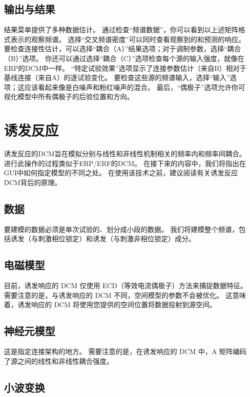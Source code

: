 \subsection{输出与结果}

结果菜单提供了多种数据估计。
通过检查“频谱数据”，你可以看到以上述矩阵格式表示的观察频谱。
选择“交叉频谱密度”可以同时查看观察到的和预测的响应。
要检查连接性估计，可以选择“耦合（A）”结果选项；对于调制参数，选择“耦合（B）”选项。
你还可以通过选择“耦合（C）”选项检查每个源的输入强度，就像在ERP的DCM中一样。
“特定试验效果”选项显示了连接参数估计（来自B）相对于基线连接（来自A）的逐试验变化。
要检查这些源的频谱输入，选择“输入”选项；这应该看起来像是白噪声和粉红噪声的混合。
最后，“偶极子”选项允许你可视化模型中所有偶极子的后验位置和方向。


\section{诱发反应}

诱发反应的DCM旨在模拟分别与线性和非线性机制相关的频率内和频率间耦合。
进行此操作的过程类似于ERP/ERF的DCM。
在接下来的内容中，我们将指出在GUI中如何指定模型的不同之处。
在使用该技术之前，建议阅读有关诱发反应DCM背后的原理\cite{u23}。


\subsection{数据}

要建模的数据必须是单次试验的、划分成小段的数据。
我们将建模整个频谱，包括诱发（与刺激相位锁定）和诱发（与刺激非相位锁定）成分。


\subsection{电磁模型}

目前，诱发响应的 DCM 仅使用 ECD（等效电流偶极子）方法来捕捉数据特征。
需要注意的是，与诱发响应的 DCM 不同，空间模型的参数不会被优化。
这意味着，诱发响应的 DCM 将使用您提供的空间位置将数据投射到源空间。


\subsection{神经元模型}

这是指定连接架构的地方。
需要注意的是，在诱发响应的 DCM 中，A 矩阵编码了源之间的线性和非线性耦合强度。


\subsection{小波变换}

